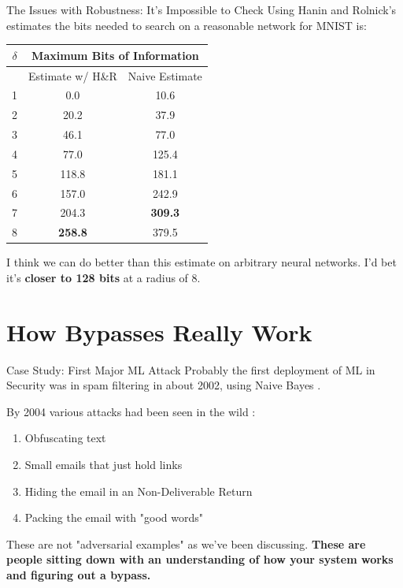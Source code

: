 \documentclass{beamer}
\begin{document}
\begin{frame}{The Issues with Robustness: It's Impossible to Check}
    Using Hanin and Rolnick's estimates the bits needed to search on a reasonable network for MNIST is:
    \begin{center}
        \begin{tabular}{| c || c | c |}
            \hline
            $\delta$ & \multicolumn{2}{|c|}{Maximum Bits of Information} \\
            \hline
            & Estimate w/ H\&R & Naive Estimate \\
            \hline
                1 & 0.0 & 10.6 \\
                2 & 20.2 & 37.9 \\
                3 & 46.1 & 77.0 \\
                4 & 77.0 & 125.4 \\
                5 & 118.8 & 181.1 \\
                6 & 157.0 & 242.9 \\
                7 & 204.3 & \textbf{309.3} \\
                8 & \textbf{258.8} & 379.5 \\
            \hline
        \end{tabular}
        \vspace{10pt}

        I think we can do better than this estimate on arbitrary neural networks. I'd bet it's \textbf{closer to 128 bits} at a radius of 8.
    \end{center}
\end{frame}

\section{How Bypasses Really Work}

\begin{frame}{Case Study: First Major ML Attack}
    Probably the first deployment of ML in Security was in spam filtering in about 2002, using Naive Bayes \cite{spam_bayes}.
    \vspace{10pt} \pause

    By 2004 various attacks had been seen in the wild \cite{how_to_beat_spam}:
    \begin{enumerate}
        \item Obfuscating text 
        \item Small emails that just hold links
        \item Hiding the email in an Non-Deliverable Return
        \item Packing the email with "good words"
    \end{enumerate}
    \vspace{10pt} \pause

    These are not "adversarial examples" as we've been discussing. \textbf{These are people sitting down with an understanding of how your system works and figuring out a bypass.}
\end{frame}
\end{document}
